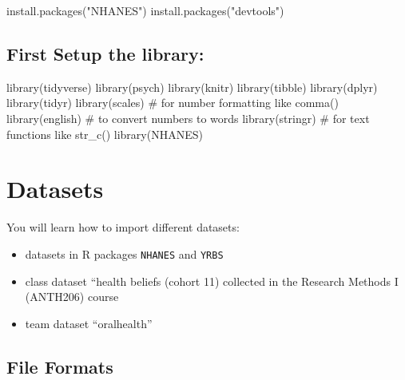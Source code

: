 \documentclass[
  english,
  letterpaper,
  DIV=11,
  numbers=noendperiod]{scrreprt}
\newenvironment{Shaded}{\begin{snugshade}}{\end{snugshade}}
\newcommand{\CommentTok}[1]{\textcolor[rgb]{0.37,0.37,0.37}{#1}}
\newcommand{\FunctionTok}[1]{\textcolor[rgb]{0.28,0.35,0.67}{#1}}
\newcommand{\NormalTok}[1]{\textcolor[rgb]{0.00,0.23,0.31}{#1}}
\newcommand{\StringTok}[1]{\textcolor[rgb]{0.13,0.47,0.30}{#1}}
\begin{document}
\begin{Shaded}
\begin{Highlighting}[]
\FunctionTok{install.packages}\NormalTok{(}\StringTok{"NHANES"}\NormalTok{)}
\FunctionTok{install.packages}\NormalTok{(}\StringTok{"devtools"}\NormalTok{)}
\end{Highlighting}
\end{Shaded}

\section{First Setup the library:}\label{first-setup-the-library}

\begin{Shaded}
\begin{Highlighting}[]
\FunctionTok{library}\NormalTok{(tidyverse)}
\FunctionTok{library}\NormalTok{(psych)}
\FunctionTok{library}\NormalTok{(knitr)}
\FunctionTok{library}\NormalTok{(tibble)}
\FunctionTok{library}\NormalTok{(dplyr)}
\FunctionTok{library}\NormalTok{(tidyr)}
\FunctionTok{library}\NormalTok{(scales)     }\CommentTok{\# for number formatting like comma()}
\FunctionTok{library}\NormalTok{(english)    }\CommentTok{\# to convert numbers to words}
\FunctionTok{library}\NormalTok{(stringr)    }\CommentTok{\# for text functions like str\_c()}
\FunctionTok{library}\NormalTok{(NHANES)}
\end{Highlighting}
\end{Shaded}

\chapter{Datasets}\label{datasets}

You will learn how to import different datasets:

\begin{itemize}
\item
  datasets in R packages \texttt{NHANES} and \texttt{YRBS}
\item
  class dataset ``health beliefs (cohort 11) collected in the Research
  Methods I (ANTH206) course
\item
  team dataset ``oralhealth''
\end{itemize}

\section{File Formats}\label{file-formats}
\end{document}
